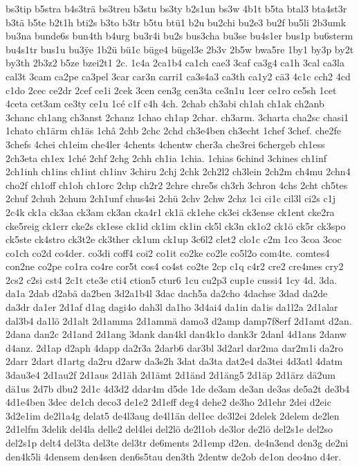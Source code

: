 {bs3tip
b5stra
b4s3trä
bs3treu
b3stu
bs3ty
b2s1un
bs3w
4b1t
b5ta
btal3
bta4st3r
b3tä
b5te
b2t1h
bti2s
b3to
b3tr
b5tu
btü1
b2u
bu2chi
bu2e3
bu2f
bu5li
2b3umk
bu3na
bunde6s
bun4th
b4urg
bu3r4i
bu2s
bus3cha
bu3se
bu4s1er
bus1p
bu6sterm
bu4s1tr
bus1u
bu3^^ffe
1b2ü
bü1c
büge4
bügel3e
2b3v
2b5w
bwa5re
1by1
by3p
by2t
by3th
2b3z2
b5ze
bzei2t1
2c.
1c4a
2ca1b4
ca1ch
cae3
3caf
ca3g4
ca1h
3cal
ca3la
cal3t
3cam
ca2pe
ca3pel
3car
car3n
carri1
ca3s4a3
ca3th
ca1y2
cä3
4c1c
cch2
4cd
c1do
2cec
ce2dr
2cef
ce1i
2cek
3cen
cen3g
cen3ta
ce3n1u
1cer
ce1ro
ce5sh
1cet
4ceta
cet3am
ce3ty
ce1u
1cé
c1f
c4h
4ch.
2chab
ch3abi
ch1ah
ch1ak
ch2anb
3chanc
ch1ang
ch3anst
2chanz
1chao
ch1ap
2char.
ch3arm.
3charta
cha2sc
chasi1
1chato
ch1ärm
ch1äs
1châ
2chb
2chc
2chd
ch3e4ben
ch3echt
1chef
3chef.
che2fe
3chefs
4chei
ch1eim
che4ler
4chents
4chentw
cher3a
che3rei
6chergeb
ch1ess
2ch3eta
ch1ex
1ché
2chf
2chg
2chh
ch1ia
1chia.
1chias
6chind
3chines
ch1inf
2ch1inh
ch1ins
ch1int
ch1inv
3chiru
2chj
2chk
2ch2l2
ch3lein
2ch2m
ch4mu
2chn4
cho2f
ch1off
ch1oh
ch1orc
2chp
ch2r2
2chre
chre5s
ch3rh
3chron
4chs
2cht
ch5tes
2chuf
2chuh
2chum
2ch1unf
chus4si
2chü
2chv
2chw
2chz
1ci
ci1c
cil3l
ci2s
c1j
2c4k
ck1a
ck3aa
ck3am
ck3an
cka4r1
ck1ä
ck1ehe
ck3ei
ck3ense
ck1ent
cke2ra
cke5reig
ck1err
cke2s
ck1ese
ck1id
ck1im
ck1in
ck5l
ck3n
ck1o2
ck1ö
ck5r
ck3spo
ck5ste
ck4stro
ck3t2e
ck3ther
ck1um
ck1up
3c6l2
clet2
clo1c
c2m
1co
3coa
3coc
co1ch
co2d
co4der.
co3di
coff4
coi2
co1it
co2ke
co2le
co5l2o
com4te.
comtes4
con2ne
co2pe
co1ra
co4re
cor5t
cos4
co4st
co2te
2cp
c1q
c4r2
cre2
cre4mes
cry2
2cs2
c2si
cst4
2c1t
cte3e
cti4
ction5
ctur6
1cu
cu2p3
cup1e
cussi4
1cy
4d.
3da.
da1a
2dab
d2abä
da2ben
3d2a1b4l
3dac
dach5a
da2cho
4dachse
3dad
da2de
da3dr
da1er
2d1af
d1ag
dagi4o
dah3l
da1ho
3d4ai4
da1in
da1is
da1l2a
2d1alar
dal3b4
da1lö
2d1alt
2d1amma
2d1ammä
damo3
d2amp
damp7f8erf
2d1amt
d2an.
2dana
dan2c
2d1and
2d1ang
3dank
dan4kl
dan4k1o
dank3r
2danl
4d1ans
2danw
d4anz.
2d1ap
d2aph
4dapp
da2r3a
2darb6
dar3bl
3d2arl
dar2ma
dar2m1i
da2ro
2darr
2dart
d1artg
da2ru
d2arw
da3s2h
3dat
da3ta
dat2e4
da3tei
4d3atl
4datm
3dau3e4
2d1au2f
2d1aus
2d1äh
2d1ämt
2d1änd
2d1äng5
2d1äp
2d1ärz
dä2um
dä1us
2d7b
dbu2
2d1c
4d3d2
ddar4m
d5de
1de
de3am
de3an
de3as
de5a2t
de3b4
4d1e4ben
3dec
de1ch
deco3
de1e2
2d1eff
deg4
dehe2
de3ho
2d1ehr
2dei
d2eic
3d2e1im
de2l1a4g
delat5
de4l3aug
de4l1än
del1ec
de3l2ei
2delek
2delem
de2len
2d1elfm
3delik
del4la
delle2
del4lei
del2lö
de2l1ob
de3lor
de2lö
del2s1e
del2so
del2s1p
delt4
del3ta
del3te
del3tr
de6ments
2d1emp
d2en.
de4n3end
den3g
de2ni
den4k5li
4densem
den4sen
den6s5tau
den3th
2dentw
de2ob
de1on
deo4no
d4er.
}
